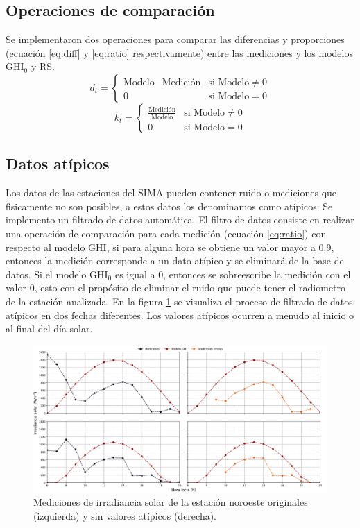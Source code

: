 \subsection{Operaciones de comparación}
Se implementaron dos operaciones para comparar las diferencias y proporciones (ecuación \ref{eq:diff} y \ref{eq:ratio} respectivamente) entre las mediciones y los modelos GHI$_0$ y RS.
\begin{equation}
	d_t = \begin{cases}
		\text{Modelo} - \text{Medición} & \text{si Modelo}\neq 0 \\
		0                               & \text{si Modelo} = 0
	\end{cases}
	\label{eq:diff}
\end{equation}
\begin{equation}
	k_t = \begin{cases}
		\frac{\text{Medición}}{\text{Modelo}} & \text{si Modelo}\neq 0 \\
		0                                     & \text{si Modelo} = 0
	\end{cases}
	\label{eq:ratio}
\end{equation}
\subsection{Datos atípicos}
Los datos de las estaciones del SIMA pueden contener ruido o mediciones que fisicamente no son posibles, a estos datos los denominamos como atípicos. Se implemento un filtrado de datos automática. El filtro de datos consiste en realizar una operación de comparación para cada medición (ecuación \ref{eq:ratio}) con respecto al modelo GHI, si para alguna hora se obtiene un valor mayor a 0.9, entonces la medición corresponde a un dato atípico y se eliminará de la base de datos. Si el modelo GHI$_0$ es igual a 0, entonces se sobreescribe la medición con el valor 0, esto con el propósito de eliminar el ruido que puede tener el radiometro de la estación analizada. En la figura \ref{fig:example_clean_data} se visualiza el proceso de filtrado de datos atípicos en dos fechas diferentes. Los valores atípicos ocurren a menudo al inicio o al final del día solar.
\begin{figure}[H]
	\centering
	\includegraphics[width=12cm]{Graphics/example_clean_data.png}
	\caption{Mediciones de irradiancia solar de la estación noroeste originales (izquierda) y sin valores atípicos (derecha).}
	\label{fig:example_clean_data}
\end{figure}
